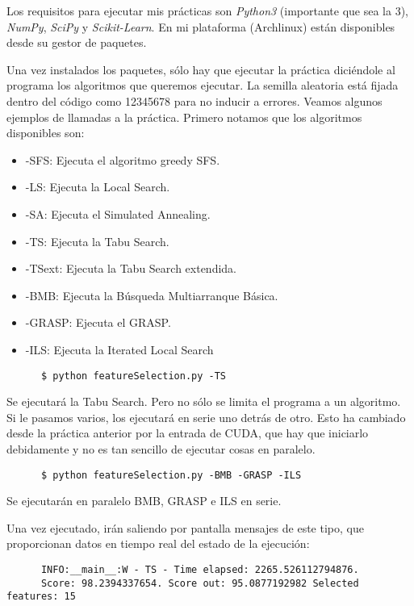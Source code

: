 \documentclass[a4paper, 11pt]{article}
\begin{document}
    Los requisitos para ejecutar mis prácticas son \emph{Python3} (importante que sea la 3), \emph{NumPy}, \emph{SciPy} y \emph{Scikit-Learn}. En mi plataforma (Archlinux) están disponibles desde su gestor de paquetes.

    Una vez instalados los paquetes, sólo hay que ejecutar la práctica diciéndole al programa los algoritmos que queremos ejecutar. La semilla aleatoria está fijada dentro del código como 12345678 para no inducir a errores. Veamos algunos ejemplos de llamadas a la práctica. Primero notamos que los algoritmos disponibles son:

    \begin{itemize}
      \item -SFS: Ejecuta el algoritmo greedy SFS.
      \item -LS: Ejecuta la Local Search.
      \item -SA: Ejecuta el Simulated Annealing.
      \item -TS: Ejecuta la Tabu Search.
      \item -TSext: Ejecuta la Tabu Search extendida.
      \item -BMB: Ejecuta la Búsqueda Multiarranque Básica.
      \item -GRASP: Ejecuta el GRASP.
      \item -ILS: Ejecuta la Iterated Local Search
    \end{itemize}

    \begin{verbatim}
      $ python featureSelection.py -TS
    \end{verbatim}
    Se ejecutará la Tabu Search. Pero no sólo se limita el programa a un algoritmo. Si le pasamos varios, los ejecutará en serie uno detrás de otro. Esto ha cambiado desde la práctica anterior por la entrada de CUDA, que hay que iniciarlo debidamente y no es tan sencillo de ejecutar cosas en paralelo.

    \begin{verbatim}
      $ python featureSelection.py -BMB -GRASP -ILS
    \end{verbatim}
    Se ejecutarán en paralelo BMB, GRASP e ILS en serie.

    Una vez ejecutado, irán saliendo por pantalla mensajes de este tipo, que proporcionan datos en tiempo real del estado de la ejecución:

    \begin{verbatim}
      INFO:__main__:W - TS - Time elapsed: 2265.526112794876.
      Score: 98.2394337654. Score out: 95.0877192982 Selected features: 15
    \end{verbatim}
\end{document}
